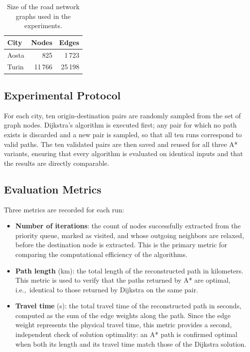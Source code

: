 \documentclass[12pt,a4paper]{article}
\begin{document}
\begin{table}[H]
  \centering
  \begin{tabular}{lrr}
    \toprule
    \textbf{City} & \textbf{Nodes} & \textbf{Edges} \\
    \midrule
    Aosta  &     825 &      1\,723 \\
    Turin  & 11\,766 &  25\,198    \\
    \bottomrule
  \end{tabular}
  \caption{Size of the road network graphs used in the experiments.}
  \label{tab:graphs}
\end{table}

\subsection{Experimental Protocol}

For each city, ten origin-destination pairs are randomly sampled from the set of graph nodes.
Dijkstra's algorithm is executed first; any pair for which no path exists is discarded and a new pair is sampled, so that all ten runs correspond to valid paths.
The ten validated pairs are then saved and reused for all three A* variants, ensuring that every algorithm is evaluated on identical inputs and that the results are directly comparable.

\subsection{Evaluation Metrics}

Three metrics are recorded for each run:
\begin{itemize}
  \item \textbf{Number of iterations}: the count of nodes successfully extracted from the priority queue, marked as visited, and whose outgoing neighbors are relaxed, before the destination node is extracted. This is the primary metric for comparing the computational efficiency of the algorithms.
  \item \textbf{Path length} (km): the total length of the reconstructed path in kilometers. This metric is used to verify that the paths returned by A* are optimal, i.e.,\ identical to those returned by Dijkstra on the same pair.
  \item \textbf{Travel time} (s): the total travel time of the reconstructed path in seconds, computed as the sum of the edge weights along the path. Since the edge weight represents the physical travel time, this metric provides a second, independent check of solution optimality: an A* path is confirmed optimal when both its length and its travel time match those of the Dijkstra solution.
\end{itemize}
\end{document}
